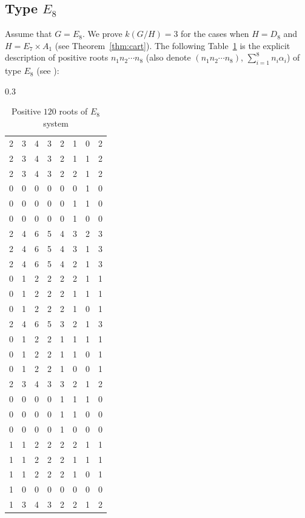 \documentclass{amsart}
\theoremstyle{definition}
\theoremstyle{remark}
\numberwithin{equation}{section}
\begin{document}
\subsection{Type $E_{8}$}
\label{sect:9.3}
Assume that $G=E_{8}$. 
We prove $k(G/H)=3$ for the cases when $H=D_{8}$ and $H=E_{7}\times A_{1}$ (see Theorem~\ref{thm:cart}).
The following Table~\ref{fig:e8} is the explicit description of positive roots $n_{1}n_{2}\cdots n_{8}$ (also denote $(n_{1}n_{2}\cdots n_{8})$, $\sum_{i=1}^{8}n_{i}\alpha_{i}$) of type $E_{8}$ (see \cite[196--202]{Y25}):
\begin{table}[h]
\centering
\caption{Positive $120$ roots of $E_{8}$ system}\label{fig:e8}
\begin{subtable}{0.3\textwidth}
\centering
\begin{tabular}{llllllll}
2 & 3 & 4 & 3 & 2 & 1 & 0 & 2 \\
2 & 3 & 4 & 3 & 2 & 1 & 1 & 2 \\
2 & 3 & 4 & 3 & 2 & 2 & 1 & 2 \\
0 & 0 & 0 & 0 & 0 & 0 & 1 & 0 \\
0 & 0 & 0 & 0 & 0 & 1 & 1 & 0 \\
0 & 0 & 0 & 0 & 0 & 1 & 0 & 0 \\
2 & 4 & 6 & 5 & 4 & 3 & 2 & 3 \\
2 & 4 & 6 & 5 & 4 & 3 & 1 & 3 \\
2 & 4 & 6 & 5 & 4 & 2 & 1 & 3 \\
0 & 1 & 2 & 2 & 2 & 2 & 1 & 1 \\
0 & 1 & 2 & 2 & 2 & 1 & 1 & 1 \\
0 & 1 & 2 & 2 & 2 & 1 & 0 & 1 \\
2 & 4 & 6 & 5 & 3 & 2 & 1 & 3 \\
0 & 1 & 2 & 2 & 1 & 1 & 1 & 1 \\
0 & 1 & 2 & 2 & 1 & 1 & 0 & 1 \\
0 & 1 & 2 & 2 & 1 & 0 & 0 & 1 \\
2 & 3 & 4 & 3 & 3 & 2 & 1 & 2 \\
0 & 0 & 0 & 0 & 1 & 1 & 1 & 0 \\
0 & 0 & 0 & 0 & 1 & 1 & 0 & 0 \\
0 & 0 & 0 & 0 & 1 & 0 & 0 & 0 \\
1 & 1 & 2 & 2 & 2 & 2 & 1 & 1 \\
1 & 1 & 2 & 2 & 2 & 1 & 1 & 1 \\
1 & 1 & 2 & 2 & 2 & 1 & 0 & 1 \\
1 & 0 & 0 & 0 & 0 & 0 & 0 & 0 \\
1 & 3 & 4 & 3 & 2 & 2 & 1 & 2 \\

\end{tabular}
\end{subtable}
\end{table}
\end{document}
